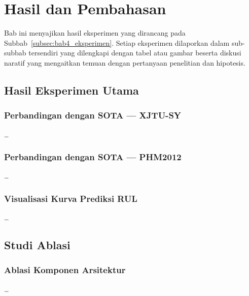 
\chapter{Hasil dan Pembahasan}
\label{bab:hasil}

Bab ini menyajikan hasil eksperimen yang dirancang pada
Subbab~\ref{subsec:bab4_eksperimen}. Setiap eksperimen dilaporkan
dalam sub-subbab tersendiri yang dilengkapi dengan tabel atau gambar
beserta diskusi naratif yang mengaitkan temuan dengan pertanyaan
penelitian dan hipotesis.

\section{Hasil Eksperimen Utama}
\label{subsec:bab5_main}

\subsection{Perbandingan dengan SOTA — XJTU-SY}
\label{subsec:bab5_main_xjtusy}

\dots

\subsection{Perbandingan dengan SOTA — PHM2012}
\label{subsec:bab5_main_phm2012}
\dots

\subsection{Visualisasi Kurva Prediksi RUL}
\label{subsec:bab5_kurva}
\dots

\section{Studi Ablasi}
\label{subsec:bab5_ablasi}

\subsection{Ablasi Komponen Arsitektur}
\label{subsec:bab5_ablasi_arch}
\dots

